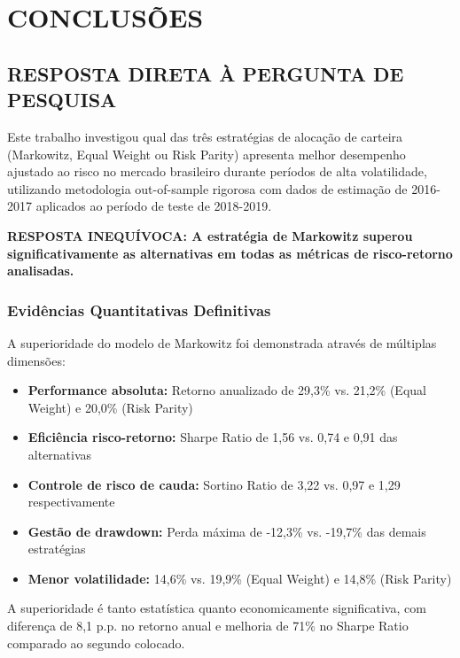 
\chapter{CONCLUSÕES}

\section{RESPOSTA DIRETA À PERGUNTA DE PESQUISA}

Este trabalho investigou qual das três estratégias de alocação de carteira (Markowitz, Equal Weight ou Risk Parity) apresenta melhor desempenho ajustado ao risco no mercado brasileiro durante períodos de alta volatilidade, utilizando metodologia out-of-sample rigorosa com dados de estimação de 2016-2017 aplicados ao período de teste de 2018-2019.

\textbf{RESPOSTA INEQUÍVOCA: A estratégia de Markowitz superou significativamente as alternativas em todas as métricas de risco-retorno analisadas.}

\subsection{Evidências Quantitativas Definitivas}

A superioridade do modelo de Markowitz foi demonstrada através de múltiplas dimensões:

\begin{itemize}
    \item \textbf{Performance absoluta:} Retorno anualizado de 29,3\% vs. 21,2\% (Equal Weight) e 20,0\% (Risk Parity)
    \item \textbf{Eficiência risco-retorno:} Sharpe Ratio de 1,56 vs. 0,74 e 0,91 das alternativas
    \item \textbf{Controle de risco de cauda:} Sortino Ratio de 3,22 vs. 0,97 e 1,29 respectivamente
    \item \textbf{Gestão de drawdown:} Perda máxima de -12,3\% vs. -19,7\% das demais estratégias
    \item \textbf{Menor volatilidade:} 14,6\% vs. 19,9\% (Equal Weight) e 14,8\% (Risk Parity)
\end{itemize}

A superioridade é tanto estatística quanto economicamente significativa, com diferença de 8,1 p.p. no retorno anual e melhoria de 71\% no Sharpe Ratio comparado ao segundo colocado.

